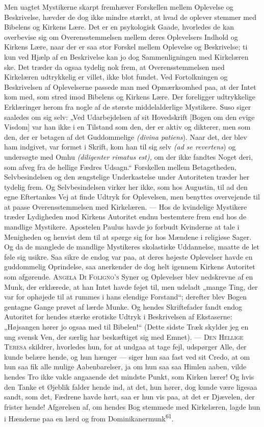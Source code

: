 \documentclass[12pt,a4paper,openany]{book}
\newcommand{\opage}[1]{\marginnote{\footnotesize\textit{[#1]}}}
\begin{document}
Men uagtet Mystikerne skarpt fremhæver Forskellen mellem Oplevelse og
Beskrivelse, hævder de dog ikke mindre stærkt, at hvad de oplever
stemmer med Bibelens og Kirkens Lære. Det er en psykologisk Gaade,
hvorledes de kan overbevise sig om Overensstemmelsen mellem deres
Oplevelsers Indhold og Kirkens Lære, naar der er saa stor Forskel mellem
Oplevelse og Beskrivelse; ti kun ved Hjælp af en Beskrivelse kan jo dog
Sammenligningen med Kirkelæren ske. Det træder da ogsaa tydelig nok
\opage{118}frem, at Overensstemmelsen med Kirkelæren udtrykkelig er
villet, ikke blot fundet. Ved Fortolkningen og Beskrivelsen af
Oplevelserne passede man med Opmærksomhed paa, at der Intet kom med, som
stred imod Bibelens og Kirkens Lære. Der foreligger udtrykkelige
Erklæringer herom fra nogle af de største middelalderlige Mystikere.
Suso siger saaledes om sig selv: „Ved Udarbejdelsen af sit Hovedskrift
[Bogen om den evige Visdom] var han ikke i en Tilstand som den, der er
aktiv og dikterer, men som den, der er betagen af det Guddommelige
\textit{(divina patiens}). Naar det, der blev ham indgivet, var formet i
Skrift, kom han til sig selv \textit{(ad se revertens}) og undersøgte
med Omhu \textit{(diligenter rimatus est),} om der ikke fandtes Noget
deri, som afveg fra de hellige Fædres Udsagn.“ Forskellen mellem
Betagetheden, Selvbesindelsen og den ængstelige Underkastelse under
Autoriteten træder her tydelig frem. Og Selvbesindelsen virker her ikke,
som hos Augustin, til ad den egne Eftertankes Vej at finde Udtryk for
Oplevelsen, men benyttes overvejende til at paase Overensstemmelsen med
Kirkelæren. --- Hos de kvindelige Mystikere træder Lydigheden mod
Kirkens Autoritet endnu bestemtere frem end hos de mandlige Mystikere.
Apostelen Paulus havde jo forbudt Kvinderne at tale i Menigheden og
henvist dem til at spørge sig for hos Mændene i religiøse Sager. Og da
de manglede de mandlige Mystikeres skolastiske Uddannelse, maatte de let
føle sig usikre. Saa sikre de endog var paa, at deres højeste Oplevelser
havde en guddommelig Oprindelse, saa anerkender de dog helt igennem
Kirkens Autoritet som afgørende. \textsc{Angela Di Foligno’s} Syner og
Oplevelser blev nedskrevne af en Munk, der erklærede, at han Intet havde
føjet til, men udeladt „mange Ting, der var for ophøjede til at rummes i
hans elendige Forstand“; derefter blev Bogen gentagne Gange prøvet af
lærde Munke. Og hendes Skriftefader fandt endog Autoritet for hendes
stærke erotiske Udtryk i Beskrivelsen af Ekstaserne: „Højsangen hører jo
ogsaa med til Bibelen!“ (Dette sidste Træk skylder jeg en ung svensk
Ven, der særlig har beskæftiget sig med Emnet). --- \textsc{Den Hellige
Teresa} skildrer, hvorledes hun, for at undgaa at tage fejl, udspørger
Alle, der kunde belære hende, og hun hænger --- siger hun saa fast ved
sit Credo, at om hun saa fik alle mulige Aabenbarelser, ja om hun saa
saa Himlen aaben, vilde hendes Tro ikke vakle angaaende det mindste
Punkt, som Kirken lærer! Og hvis den Tanke et Øjeblik falder hende ind,
at det, hun hører, dog kunde være ligesaa sandt, som det, Fædrene havde
hørt, saa er
\opage{119}hun vis paa, at det er Djævelen, der frister hende!
Afgørelsen af, om hendes Bog stemmede med Kirkelæren, lagde hun i
Hænderne paa en lærd og from Dominikanermunk\textsuperscript{61}.
\end{document}
